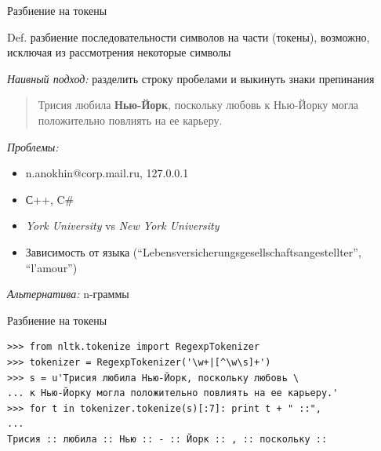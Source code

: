 \documentclass[aspectratio=169]{beamer}
\begin{document}
\begin{frame}{Разбиение на токены}

\begin{block}{Def.}
разбиение последовательности символов на части (токены), возможно, исключая из рассмотрения некоторые символы
\end{block}

\vspace{1em}
{\it Наивный подход:} разделить строку пробелами и выкинуть знаки препинания
\begin{quote}
Трисия любила {\bf Нью-Йорк}, поскольку любовь к Нью-Йорку могла положительно повлиять на ее карьеру.
\end{quote}

{\it Проблемы:}
\begin{itemize}
\item n.anokhin@corp.mail.ru, 127.0.0.1
\item С++, C\#
\item {\it York University} vs {\it New York University}
\item Зависимость от языка (``Lebensversicherungsgesellschaftsangestellter'', ``l'amour'')
\end{itemize}

{\it Альтернатива:} n-граммы

\end{frame}


\begin{frame}[fragile]{Разбиение на токены}

\begin{shaded}
{\color{green}
\begin{verbatim}
>>> from nltk.tokenize import RegexpTokenizer
>>> tokenizer = RegexpTokenizer('\w+|[^\w\s]+')
>>> s = u'Трисия любила Нью-Йорк, поскольку любовь \
... к Нью-Йорку могла положительно повлиять на ее карьеру.'
>>> for t in tokenizer.tokenize(s)[:7]: print t + " ::",
... 
Трисия :: любила :: Нью :: - :: Йорк :: , :: поскольку ::
\end{verbatim}
}
\end{shaded}

\end{frame}

\end{document}
